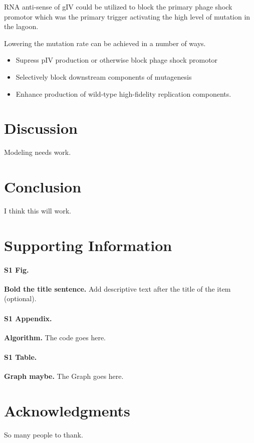 \documentclass[10pt,letterpaper]{article}
\begin{document}
RNA anti-sense of gIV could be utilized to block the primary phage shock promotor which was the primary trigger activating the high level of mutation in the lagoon.

Lowering the mutation rate can be achieved in a number of ways.

\begin{itemize}
	\item Supress pIV production or otherwise block phage shock promotor
	\item Selectively block downstream components of mutagenesis
	\item Enhance production of wild-type high-fidelity replication components.
\end{itemize}

\section*{Discussion}
Modeling needs work.

\section*{Conclusion}

I think this will work.

\section*{Supporting Information}

\paragraph*{S1 Fig.}
\label{S1_Fig}
{\bf Bold the title sentence.} Add descriptive text after the title of the item (optional).

\paragraph*{S1 Appendix.}
\label{S1_Appendix}
{\bf Algorithm.} The code goes here.

\paragraph*{S1 Table.}
\label{S1_Table}
{\bf Graph maybe.} The Graph goes here.

\section*{Acknowledgments}
So many people to thank.
\end{document}
